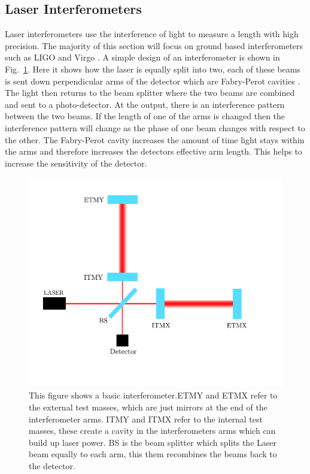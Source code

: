 \subsection{Laser Interferometers}

Laser interferometers use the interference of light to measure a length with high precision.
The majority of this section will focus on ground based interferometers such as \ac{LIGO} and Virgo \citep{aasi2015AdvancedLIGO,acernese2015AdvancedVirgo}.
A simple design of an interferometer is shown in Fig.~\ref{detectors:interferometer}. 
Here it shows how the laser is equally split into two, each of these beams is sent down perpendicular arms of the detector which are Fabry-Perot cavities \citep{}. 
The light then returns to the beam splitter where the two beams are combined and sent to a photo-detector.
At the output, there is an interference pattern between the two beams.
If the length of one of the arms is changed then the interference pattern will change as the phase of one beam changes with respect to the other.
The Fabry-Perot cavity increases the amount of time light stays within the arms and therefore increases the detectors effective arm length. This helps to increase the sensitivity of the detector.
\begin{figure}[h]
    \centering
    \includegraphics[width=\textwidth]{C1_intro/interferometer.pdf}
    \caption{This figure shows a basic interferometer.ETMY and ETMX refer to the external test masses, which are just mirrors at the end of the interferometer arms. ITMY and ITMX refer to the internal test masses, these create a cavity in the interferometers arms which can build up laser power. BS is the beam splitter which splits the Laser beam equally to each arm, this them recombines the beams back to the detector.}
    \label{detectors:interferometer}
\end{figure}

